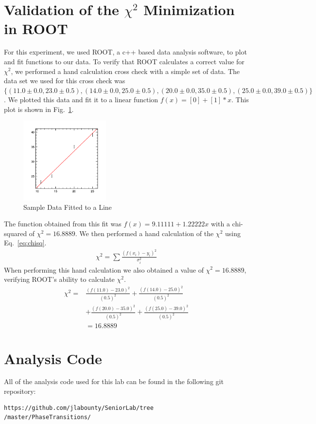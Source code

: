 \documentclass[%
 reprint,
 amsmath,amssymb,
 aps,
 pra,
]{revtex4-1}
\begin{document}
\begin{appendix}
\section{Validation of the $\chi^2$ Minimization in ROOT} \label{section:root}
For this experiment, we used ROOT, a c++ based data analysis software, to plot and fit functions to our data. To verify that ROOT calculates a correct value for $\chi^{2}$, we performed a hand calculation cross check with a simple set of data. The data set we used for this cross check was $\{ (11.0 \pm 0.0, 23.0 \pm 0.5), (14.0 \pm 0.0, 25.0 \pm 0.5), (20.0 \pm 0.0, 35.0 \pm 0.5), (25.0 \pm 0.0, 39.0 \pm 0.5) \}$. We plotted this data and fit it to a linear function $f(x) = [0] + [1]*x$. This plot is shown in Fig.~\ref{Fig:rootproof}.
\begin{figure}[H]
	\centering
	\includegraphics[width=0.4\textwidth]{rootproof.png}
	\caption{Sample Data Fitted to a Line}
	\label{Fig:rootproof}
\end{figure}
The function obtained from this fit was $f(x) = 9.11111 + 1.22222x$ with a chi-squared of $\chi ^{2} = 16.8889$. We then performed a hand calculation of the $\chi ^{2}$ using Eq.~\ref{eq:chisq}.
\begin{gather}\label{eq:chisq}
\chi ^{2} = \sum \frac{(f(x_i) - y_i)^{2}}{\sigma_i^2}
\end{gather}
When performing this hand calculation we also obtained a value of $\chi ^{2} = 16.8889$, verifying ROOT's ability to calculate $\chi ^{2}$.
\begin{align*}
\chi ^{2} =& \frac{(f(11.0) - 23.0)^{2}}{(0.5)^2} + \frac{(f(14.0) - 25.0)^{2}}{(0.5)^2} \\
&+ \frac{(f(20.0) - 35.0)^2}{(0.5)^2} + \frac{(f(25.0) - 39.0)^{2}}{(0.5)^2} \\
&= 16.8889
\end{align*}

\section{Analysis Code} \label{section:analysis_code}
All of the analysis code used for this lab can be found in the following git repository: 
\begin{verbatim}
https://github.com/jlabounty/SeniorLab/tree
/master/PhaseTransitions/
\end{verbatim}

\end{appendix}
\end{document}
